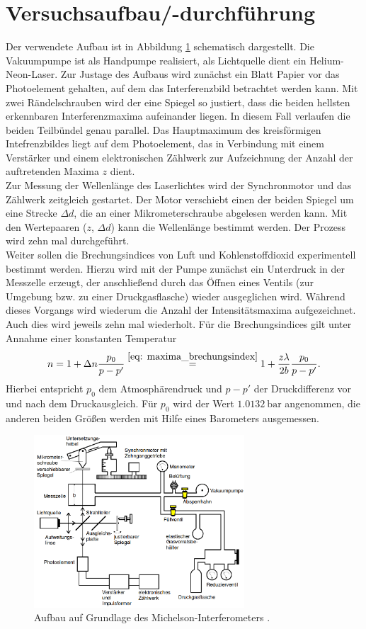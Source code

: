 \section{Versuchsaufbau/-durchführung}
Der verwendete Aufbau ist in Abbildung \ref{fig: aufbau} schematisch dargestellt. Die Vakuumpumpe ist als Handpumpe
realisiert, als Lichtquelle dient ein Helium-Neon-Laser. Zur Justage des Aufbaus wird zunächst ein Blatt Papier vor das Photoelement gehalten,
auf dem das Interferenzbild betrachtet werden kann. Mit zwei Rändelschrauben wird der eine Spiegel so justiert,  %
dass die beiden hellsten erkennbaren Interferenzmaxima
aufeinander liegen. In diesem Fall verlaufen die beiden Teilbündel genau parallel. Das Hauptmaximum des kreisförmigen Intefrenzbildes %
liegt auf dem Photoelement, das in Verbindung mit einem Verstärker und einem elektronischen Zählwerk zur Aufzeichnung der Anzahl
der auftretenden Maxima $z$ dient.\\
Zur Messung der Wellenlänge des Laserlichtes wird der Synchronmotor und das Zählwerk zeitgleich gestartet. Der Motor verschiebt einen
der beiden Spiegel um eine Strecke $\Delta d$, die an einer Mikrometerschraube abgelesen werden kann. Mit den Wertepaaren ($z$, $\Delta d$) kann
die Wellenlänge bestimmt werden. Der Prozess wird zehn mal durchgeführt. \\
Weiter sollen die Brechungsindices von Luft und Kohlenstoffdioxid experimentell bestimmt werden. Hierzu  wird mit der Pumpe zunächst ein Unterdruck
in der Messzelle erzeugt, der anschließend
durch das Öffnen eines Ventils (zur Umgebung bzw. zu einer Druckgasflasche) wieder ausgeglichen wird. Während dieses Vorgangs wird wiederum die
Anzahl der Intensitätsmaxima aufgezeichnet. Auch dies wird jeweils zehn mal wiederholt. Für die Brechungsindices gilt unter Annahme einer konstanten
Temperatur
\begin{equation}
  \label{eq: brechungsindex}
  n = 1 + \Delta n \frac{p_0}{p - p'} \overset{\eqref{eq: maxima_brechungsindex}}{=} 1 + \frac{z \lambda}{2b} \frac{p_0}{p - p'} .
\end{equation}
Hierbei entspricht $p_0$ dem Atmosphärendruck und $p - p'$ der Druckdifferenz vor und nach dem Druckausgleich. Für $p_0$ wird der Wert $\SI{1.0132}{\bar}$ angenommen,
die anderen beiden Größen werden mit Hilfe eines Barometers ausgemessen.
\begin{figure}
  \centering
  \includegraphics[width = 0.7\textwidth]{table/aufbau.png}
  \caption{Aufbau auf Grundlage des Michelson-Interferometers \cite{anleitung401}.}
  \label{fig: aufbau}
\end{figure}
